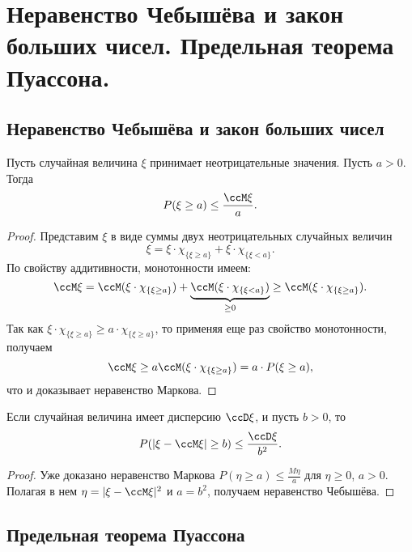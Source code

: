 \chapter{Неравенство Чебышёва и закон больших чисел. Предельная теорема Пуассона.}
\section{Неравенство Чебышёва и закон больших чисел}
\begin{thm}
Пусть случайная величина $\xi$ принимает неотрицательные значения. Пусть $a>0$. Тогда 
$$
P(\xi \ge a)\le\frac{\ccM\xi}{a}.
$$
\end{thm}
\begin{proof}
Представим $\xi$ в виде суммы двух неотрицательных случайных величин
$$
\xi = \xi\cdot\chi_{\{\xi\ge a\}}+\xi\cdot\chi_{\{\xi< a\}}.
$$
По свойству аддитивности, монотонности имеем:
$$
\ccM\xi=\ccM(\xi\cdot\chi_{\{\xi\ge a\}})+\underbrace{\ccM(\xi\cdot\chi_{\{\xi< a\}})}_{\ge 0} \ge \ccM(\xi\cdot\chi_{\{\xi\ge a\}}).
$$
Так как $\xi\cdot\chi_{\{\xi\ge a\}}\ge a\cdot\chi_{\{\xi\ge a\}}$, то применяя еще раз свойство монотонности, получаем
$$
\ccM\xi\ge a\ccM(\xi\cdot\chi_{\{\xi\ge a\}})=a\cdot P(\xi\ge a),
$$
что и доказывает неравенство Маркова.
\end{proof}

\begin{thm}
Если случайная величина имеет дисперсию $\ccD\xi$, и пусть $b>0$, то
$$
P(|\xi-\ccM\xi|\ge b ) \le\frac{\ccD\xi}{b^2}.
$$
\end{thm} 
\begin{proof}
Уже доказано неравенство Маркова $P(\eta \ge a) \le \frac{M\eta}{a}$  для $\eta \ge 0$, $a>0$. Полагая в нем $\eta = |\xi-\ccM\xi|^2$ и $a=b^2$, получаем неравенство Чебышёва.
\end{proof}



\section{Предельная теорема Пуассона}